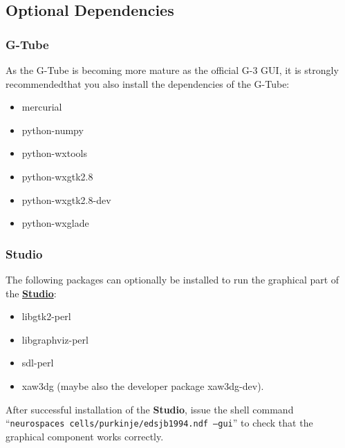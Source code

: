 \documentclass[12pt]{article}
\begin{document}
\subsection*{Optional Dependencies}

\subsubsection*{G-Tube}

As the G-Tube is becoming more mature as the official G-3 GUI, it is
strongly recommendedthat you also install the dependencies of the G-Tube:

\begin{itemize}
\item mercurial
\item python-numpy
\item python-wxtools
\item python-wxgtk2.8
\item python-wxgtk2.8-dev
\item python-wxglade
\end{itemize}

\subsubsection*{Studio}

The following packages can optionally be installed to run the
graphical part of the \href{../studio/studio.tex}{\bf Studio}:
\begin{itemize}
\item libgtk2-perl
\item libgraphviz-perl
\item sdl-perl
\item xaw3dg (maybe also the developer package xaw3dg-dev).
\end{itemize}
After successful installation of the {\bf Studio}, issue the
shell command ``{\tt neurospaces cells/purkinje/edsjb1994.ndf --gui}'' to check that 
the graphical component works correctly.
\end{document}

